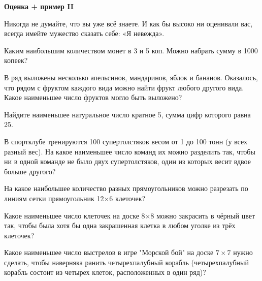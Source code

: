 \centerline{\bf \Huge Оценка + пример II}

\begin{flushright}
        \scriptsize{Никогда не думайте, что вы уже всё знаете. И как бы высоко ни оценивали вас, всегда имейте мужество сказать себе: «Я невежда».}
\end{flushright}

 Каким наибольшим количеством монет в 3 и 5 коп. Можно набрать сумму в 1000 копеек?

 В ряд выложены несколько апельсинов, мандаринов, яблок и бананов. Оказалось, что рядом с фруктом каждого вида можно найти фрукт любого другого вида. Какое наименьшее число фруктов могло быть выложено?

 Найдите наименьшее натуральное число кратное 5, сумма цифр которого равна 25.

 В спортклубе тренируются 100 супертолстяков весом от 1 до 100 тонн (у всех разный вес). На какое наименьшее число команд их можно разделить так, чтобы ни в одной команде не было двух супертолстяков, один из которых весит вдвое больше другого?


 На какое наибольшее количество разных прямоугольников можно разрезать по линиям сетки прямоугольник 12×6 клеточек?


 Какое наименьшее число клеточек на доске 8×8 можно закрасить в чёрный цвет так, чтобы была хотя бы одна закрашенная клетка в любом уголке из трёх клеточек?


 Какое наименьшее число выстрелов в игре "Морской бой" на доске $7\times7$ нужно сделать, чтобы наверняка ранить четырехпалубный корабль (четырехпалубный корабль состоит из четырех клеток, расположенных в один ряд)?


